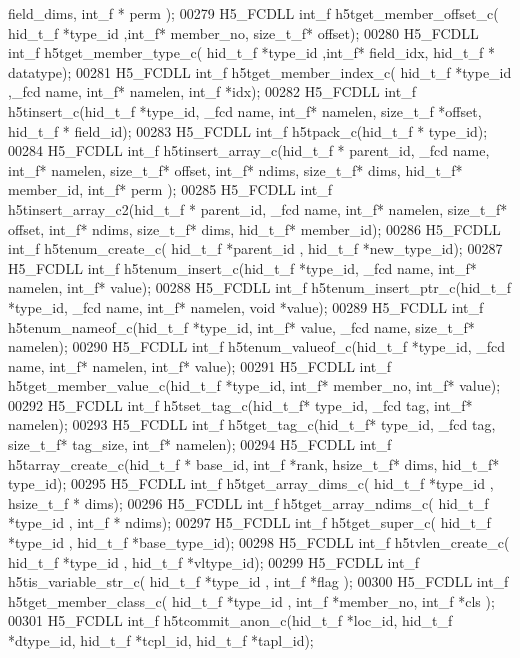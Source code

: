 \begin{DoxyCode}
      field\_dims, int\_f * perm );
00279 H5\_FCDLL int\_f h5tget\_member\_offset\_c( hid\_t\_f *type\_id ,int\_f* member\_no, size\_t\_f* offset);
00280 H5\_FCDLL int\_f h5tget\_member\_type\_c( hid\_t\_f *type\_id ,int\_f* field\_idx, hid\_t\_f * datatype);
00281 H5\_FCDLL int\_f h5tget\_member\_index\_c( hid\_t\_f *type\_id ,\_fcd name, int\_f* namelen, int\_f *idx);
00282 H5\_FCDLL int\_f h5tinsert\_c(hid\_t\_f *type\_id, \_fcd name, int\_f* namelen, size\_t\_f *offset, hid\_t\_f * 
      field\_id);
00283 H5\_FCDLL int\_f h5tpack\_c(hid\_t\_f * type\_id);
00284 H5\_FCDLL int\_f h5tinsert\_array\_c(hid\_t\_f * parent\_id, \_fcd name, int\_f* namelen, size\_t\_f* offset, int\_f* 
      ndims, size\_t\_f* dims, hid\_t\_f* member\_id, int\_f* perm );
00285 H5\_FCDLL int\_f h5tinsert\_array\_c2(hid\_t\_f * parent\_id, \_fcd name, int\_f* namelen, size\_t\_f* offset, int\_f* 
      ndims, size\_t\_f* dims, hid\_t\_f* member\_id);
00286 H5\_FCDLL int\_f h5tenum\_create\_c( hid\_t\_f *parent\_id , hid\_t\_f *new\_type\_id);
00287 H5\_FCDLL int\_f h5tenum\_insert\_c(hid\_t\_f *type\_id, \_fcd name, int\_f* namelen, int\_f* value);
00288 H5\_FCDLL int\_f h5tenum\_insert\_ptr\_c(hid\_t\_f *type\_id, \_fcd name, int\_f* namelen, \textcolor{keywordtype}{void} *value);
00289 H5\_FCDLL int\_f h5tenum\_nameof\_c(hid\_t\_f *type\_id, int\_f* value, \_fcd name, size\_t\_f* namelen);
00290 H5\_FCDLL int\_f h5tenum\_valueof\_c(hid\_t\_f *type\_id, \_fcd name, int\_f* namelen, int\_f* value);
00291 H5\_FCDLL int\_f h5tget\_member\_value\_c(hid\_t\_f *type\_id, int\_f* member\_no, int\_f* value);
00292 H5\_FCDLL int\_f h5tset\_tag\_c(hid\_t\_f* type\_id, \_fcd tag, int\_f* namelen);
00293 H5\_FCDLL int\_f h5tget\_tag\_c(hid\_t\_f* type\_id, \_fcd tag, size\_t\_f* tag\_size, int\_f* namelen);
00294 H5\_FCDLL int\_f h5tarray\_create\_c(hid\_t\_f * base\_id, int\_f *rank, hsize\_t\_f* dims, hid\_t\_f* type\_id);
00295 H5\_FCDLL int\_f h5tget\_array\_dims\_c( hid\_t\_f *type\_id , hsize\_t\_f * dims);
00296 H5\_FCDLL int\_f h5tget\_array\_ndims\_c( hid\_t\_f *type\_id , int\_f * ndims);
00297 H5\_FCDLL int\_f h5tget\_super\_c( hid\_t\_f *type\_id , hid\_t\_f *base\_type\_id);
00298 H5\_FCDLL int\_f h5tvlen\_create\_c( hid\_t\_f *type\_id , hid\_t\_f *vltype\_id);
00299 H5\_FCDLL int\_f h5tis\_variable\_str\_c( hid\_t\_f *type\_id , int\_f *flag );
00300 H5\_FCDLL int\_f h5tget\_member\_class\_c( hid\_t\_f *type\_id ,  int\_f *member\_no, int\_f *cls );
00301 H5\_FCDLL int\_f h5tcommit\_anon\_c(hid\_t\_f *loc\_id, hid\_t\_f *dtype\_id, hid\_t\_f *tcpl\_id, hid\_t\_f *tapl\_id);

\end{DoxyCode}
